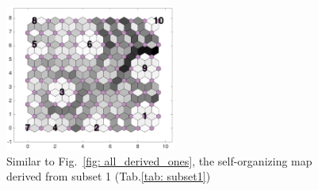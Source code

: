 \begin{figure}
        \centering
        \includegraphics[width=0.5\textwidth]{../../images0.01/M31/2D/image_subsets/subset1_dist_with_hits_t.png}
    \caption{Similar to Fig.~\ref{fig: all_derived_ones}, the self-organizing map derived from subset 1 (Tab.\ref{tab: subset1})}
    \label{fig: subset1}
\end{figure}